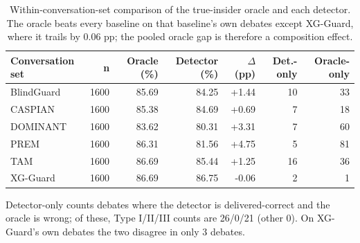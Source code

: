 \begin{table}[htbp]
\centering
\small
\caption{Within-conversation-set comparison of the true-insider oracle and each detector. The oracle beats every baseline on that baseline's own debates except XG-Guard, where it trails by 0.06 pp; the pooled oracle gap is therefore a composition effect.}
\label{tab:oracle-within}
\begin{tabular}{lrrrrrr}
\toprule
Conversation set & n & Oracle (\%) & Detector (\%) & $\Delta$ (pp) & Det.-only & Oracle-only \\
\midrule
BlindGuard & 1600 & 85.69 & 84.25 & +1.44 & 10 & 33 \\
CASPIAN & 1600 & 85.38 & 84.69 & +0.69 & 7 & 18 \\
DOMINANT & 1600 & 83.62 & 80.31 & +3.31 & 7 & 60 \\
PREM & 1600 & 86.31 & 81.56 & +4.75 & 5 & 81 \\
TAM & 1600 & 86.69 & 85.44 & +1.25 & 16 & 36 \\
XG-Guard & 1600 & 86.69 & 86.75 & -0.06 & 2 & 1 \\
\bottomrule
\end{tabular}
\par\smallskip\footnotesize Detector-only counts debates where the detector is delivered-correct and the oracle is wrong; of these, Type I/II/III counts are 26/0/21 (other 0). On XG-Guard's own debates the two disagree in only 3 debates.
\end{table}
